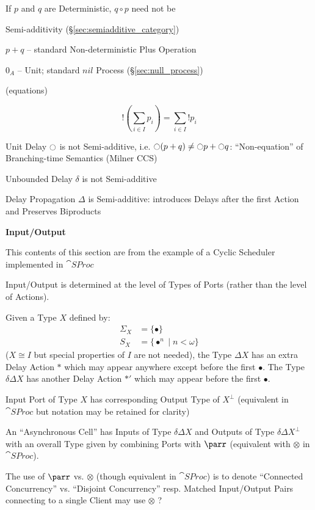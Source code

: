 If $p$ and $q$ are Deterministic, $q \circ p$ need not be

Semi-additivity (\S\ref{sec:semiadditive_category})

$p+q$ -- standard Non-deterministic Plus Operation

$0_A$ -- Unit; standard $nil$ Process (\S\ref{sec:null_process})

(equations) %

\[
  !(\sum_{i \in I} p_i) = \sum_{i \in I} !p_i
\]

Unit Delay $\ocircle$ is not Semi-additive, i.e. $\ocircle(p+q) \neq
\ocircle p + \ocircle q$: ``Non-equation'' of Branching-time Semantics
(Milner CCS)

Unbounded Delay $\delta$ is not Semi-additive

Delay Propagation $\Delta$ is Semi-additive: introduces Delays after
the first Action and Preserves Biproducts


\asterism


\textbf{Input/Output}

\fist This contents of this section are from the example of a Cyclic
Scheduler implemented in $\cat{SProc}$ \cite{abramsky-gay-nagarajan96}

Input/Output is determined at the level of Types of Ports (rather than
the level of Actions).

Given a Type $X$ defined by:
\begin{align*}
  \Sigma_X &= \{\bullet\} \\
  S_X &= \{\bullet^n \mid n < \omega \}
\end{align*}
($X \cong I$ but special properties of $I$ are not needed), the Type
$\Delta X$ has an extra Delay Action $*$ which may appear anywhere
except before the first $\bullet$. The Type $\delta\Delta X$ has
another Delay Action $*'$ which may appear before the first $\bullet$.

Input Port of Type $X$ has corresponding Output Type of $X^\bot$
(equivalent in $\cat{SProc}$ but notation may be retained for clarity)

An ``Asynchronous Cell'' has Inputs of Type $\delta\Delta X$ and
Outputs of Type $\delta\Delta X^\bot$ with an overall Type given by
combining Ports with $\parr$ (equivalent with $\otimes$ in
$\cat{SProc}$).

\fist The use of $\parr$ vs. $\otimes$ (though equivalent in
$\cat{SProc}$) is to denote ``Connected Concurrency'' vs. ``Disjoint
Concurrency'' resp. Matched Input/Output Pairs connecting to a single
Client may use $\otimes$ ? %

